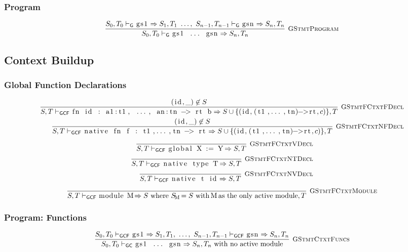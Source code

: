 \documentclass{article}
\newcommand{\code}[1]{\lstinline[columns=fixed]{#1}}
\newcommand{\drmrule}[5]{\frac{#1}{#2\vdash_{\mathsf{#3}}#4}\textsc{\ \small{#5}}}
\newcommand{\ruleapp}[1]{\vdash_{\mathsf{#1}}}
\newcommand{\mc}[1]{\textnormal{\code{#1}}}
\begin{document}
			\subsubsection{Program}
			
				\begin{align*}
					\drmrule{S_0,T_0 \ruleapp{G} \mc{gs1} \Rightarrow S_1,T_1\ \dots,\ S_{n-1},T_{n-1} \ruleapp{G} \mc{gsn} \Rightarrow S_n,T_n}{S_0,T_0}{G}{\mc{gs1 ... gsn} \Rightarrow S_n,T_n}{GStmtProgram}
				\end{align*}
				
		\subsection{Context Buildup}
		
			\subsubsection{Global Function Declarations}
			
				\begin{align*}
					\drmrule{(\mc{id},\_) \not\in S}{S,T}{GCF}{\mc{fn id : a1:t1, ..., an:tn -> rt b} \Rightarrow S \cup \{(\mc{id}, \mc{(t1,...,tn)->rt}, c)\},T}{GStmtFCtxtFDecl}\\
					\drmrule{(\mc{id},\_) \not\in S}{S,T}{GCF}{\mc{native fn f : t1,...,tn -> rt} \Rightarrow S \cup \{(\mc{id}, \mc{(t1,...,tn)->rt}, c)\},T}{GStmtFCtxtNFDecl}
				\end{align*}\begin{align*}
					\drmrule{}{S,T}{GCF}{\mc{global X := Y} \Rightarrow S,T}{GStmtFCtxtVDecl}\\
					\drmrule{}{S,T}{GCF}{\mc{native type T} \Rightarrow S,T}{GStmtFCtxtNTDecl}\\
					\drmrule{}{S,T}{GCF}{\mc{native t id} \Rightarrow S,T}{GStmtFCtxtNVDecl}
				\end{align*}\begin{align*}
					\drmrule{}{S,T}{GCF}{\mc{module M} \Rightarrow S\textnormal{ where $S_{\mc{M}} = S$ with \code{M} as the only active module}, T}{GStmtFCtxtModule}
				\end{align*}
			
			\subsubsection{Program: Functions}
			
				\begin{align*}
					\drmrule{S_0,T_0 \ruleapp{GCF} \mc{gs1} \Rightarrow S_1,T_1,\ \dots,\ S_{n-1},T_{n-1} \ruleapp{GCF} \mc{gsn} \Rightarrow S_n,T_n}{S_0,T_0}{GC}{\mc{gs1 ... gsn} \Rightarrow S_n,T_n \textnormal{ with no active module}}{GStmtCtxtFuncs}
				\end{align*}
			
\end{document}
